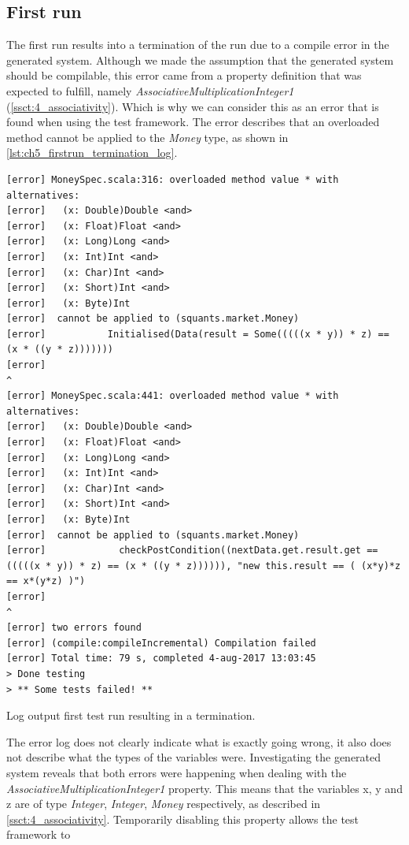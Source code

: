 \subsection{First run}
The first run results into a termination of the run due to a compile error in the generated system. Although we made the assumption that the generated system should be compilable, this error came from a property definition that was expected to fulfill, namely \textit{AssociativeMultiplicationInteger1} (\autoref{ssct:4_associativity}). Which is why we can consider this as an error that is found when using the test framework. The error describes that an overloaded method cannot be applied to the \textit{Money} type, as shown in \autoref{lst:ch5_firstrun_termination_log}.
\FloatBarrier
\begin{sourcecode}[h!]
\begin{lstlisting}[language=Log]
[error] MoneySpec.scala:316: overloaded method value * with alternatives:
[error]   (x: Double)Double <and>
[error]   (x: Float)Float <and>
[error]   (x: Long)Long <and>
[error]   (x: Int)Int <and>
[error]   (x: Char)Int <and>
[error]   (x: Short)Int <and>
[error]   (x: Byte)Int
[error]  cannot be applied to (squants.market.Money)
[error]           Initialised(Data(result = Some(((((x * y)) * z) == (x * ((y * z)))))))
[error]                                                                 ^
[error] MoneySpec.scala:441: overloaded method value * with alternatives:
[error]   (x: Double)Double <and>
[error]   (x: Float)Float <and>
[error]   (x: Long)Long <and>
[error]   (x: Int)Int <and>
[error]   (x: Char)Int <and>
[error]   (x: Short)Int <and>
[error]   (x: Byte)Int
[error]  cannot be applied to (squants.market.Money)
[error]             checkPostCondition((nextData.get.result.get == (((((x * y)) * z) == (x * ((y * z)))))), "new this.result == ( (x*y)*z == x*(y*z) )")
[error]                                                                                    ^
[error] two errors found
[error] (compile:compileIncremental) Compilation failed
[error] Total time: 79 s, completed 4-aug-2017 13:03:45
> Done testing
> ** Some tests failed! **
\end{lstlisting}
\caption{Log output first test run resulting in a termination.}
\label{lst:ch5_firstrun_termination_log}
\end{sourcecode}
\FloatBarrier
The error log does not clearly indicate what is exactly going wrong, it also does not describe what the types of the variables were. Investigating the generated system reveals that both errors were happening when dealing with the \textit{AssociativeMultiplicationInteger1} property. This means that the variables x, y and z are of type \textit{Integer}, \textit{Integer}, \textit{Money} respectively, as described in \autoref{ssct:4_associativity}. Temporarily disabling this property allows the test framework to

